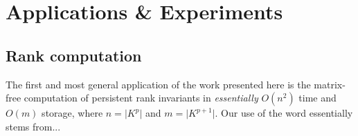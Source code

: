 \documentclass[10pt]{article}
\numberwithin{equation}{section}
\newcommand{\+}{%
	\raisebox{0.18ex}{\scaleobj{0.55}{+}}
}
\newtheorem{corollary}{Corollary}
\theoremstyle{definition}
\theoremstyle{definition}
\begin{document}





\newpage

\newpage

\section{Applications \& Experiments}\label{sec:applications}

\subsection{Rank computation}
 The first and most general application of the work presented here is the matrix-free computation of persistent rank invariants in \emph{essentially} $O(n^2)$ time and $O(m)$ storage, where $n = \lvert K^p \rvert$ and $m = \lvert K^{p+1}\rvert$. 
 Our use of the word essentially stems from...
\end{document}
